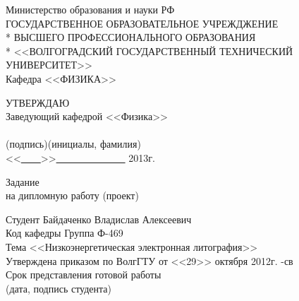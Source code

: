 \begin{titlepage}
\begin{center}
Министерство образования и науки РФ \\
\vspace{.5cm}
ГОСУДАРСТВЕННОЕ ОБРАЗОВАТЕЛЬНОЕ УЧРЕЖДЖЕНИЕ\\*
ВЫСШЕГО ПРОФЕССИОНАЛЬНОГО ОБРАЗОВАНИЯ\\*
<<ВОЛГОГРАДСКИЙ ГОСУДАРСТВЕННЫЙ ТЕХНИЧЕСКИЙ УНИВЕРСИТЕТ>>\\
\vspace{.5cm}
Кафедра <<ФИЗИКА>>
\vspace{.5cm}
\end{center}
\begin{flushright}
УТВЕРЖДАЮ\\
Заведующий кафедрой <<Физика>>\\
\vspace{.3cm}
\underline{\hspace{2cm}}\hspace{1cm}\underline{\hspace{4cm}}\\
\vspace{-.2cm}\footnotesize(подпись)\hspace{1.8cm}(инициалы, фамилия)\hspace*{.2cm}\ \normalsize\\
\vspace{.3cm}
<<\underline{\ \ \ \ }>>\underline{\ \ \ \ \ \ \ \ \ \ \ \ \ \ } 2013г.
\end{flushright}
\begin{center}
\large Задание \\
\normalsize на дипломную работу (проект)
\end{center}
\begin{flushleft}
Студент Байдаченко Владислав Алексеевич\\
Код кафедры \underline{\hspace{3cm}}\hspace{6cm}Группа Ф-469\\
Тема <<Низкоэнергетическая электронная литография>>\\
Утверждена приказом по ВолгГТУ от <<29>> октября 2012г. -св\\
Срок представления готовой работы \underline{\hspace{6cm}}\\
\vspace{-.2cm}\hspace{9.5cm}\footnotesize(дата, подпись студента)\normalsize\\

\end{flushleft}
\end{titlepage}
